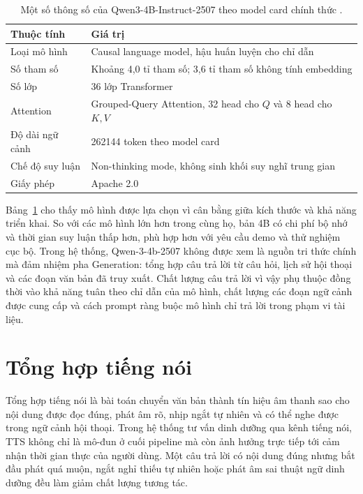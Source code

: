 \documentclass[a4paper,13pt,twoside]{report}
\begin{document}
\begin{table}[H]
    \centering
    \begin{tabular}{p{5.2cm}p{8.5cm}}
        \toprule
        Thuộc tính      & Giá trị                                                          \\
        \midrule
        Loại mô hình    & Causal language model, hậu huấn luyện cho chỉ dẫn                \\
        Số tham số      & Khoảng 4,0 tỉ tham số; 3,6 tỉ tham số không tính embedding       \\
        Số lớp          & 36 lớp Transformer                                               \\
        Attention       & Grouped-Query Attention, 32 head cho \(Q\) và 8 head cho \(K,V\) \\
        Độ dài ngữ cảnh & 262144 token theo model card                                     \\
        Chế độ suy luận & Non-thinking mode, không sinh khối suy nghĩ trung gian           \\
        Giấy phép       & Apache 2.0                                                       \\
        \bottomrule
    \end{tabular}
    \caption[Một số thông số của Qwen3-4B-Instruct-2507]{Một số thông số của Qwen3-4B-Instruct-2507 theo model card chính thức \cite{qwen3modelcard}.}
    \label{tab:qwen3-4b-specs}
\end{table}

Bảng~\ref{tab:qwen3-4b-specs} cho thấy mô hình được lựa chọn vì cân bằng giữa kích thước và khả năng triển khai. So với các mô hình lớn hơn trong cùng họ, bản 4B có chi phí bộ nhớ và thời gian suy luận thấp hơn, phù hợp hơn với yêu cầu demo và thử nghiệm cục bộ. Trong hệ thống, Qwen-3-4b-2507 không được xem là nguồn tri thức chính mà đảm nhiệm pha Generation: tổng hợp câu trả lời từ câu hỏi, lịch sử hội thoại và các đoạn văn bản đã truy xuất. Chất lượng câu trả lời vì vậy phụ thuộc đồng thời vào khả năng tuân theo chỉ dẫn của mô hình, chất lượng các đoạn ngữ cảnh được cung cấp và cách prompt ràng buộc mô hình chỉ trả lời trong phạm vi tài liệu.

\section{Tổng hợp tiếng nói}

Tổng hợp tiếng nói là bài toán chuyển văn bản thành tín hiệu âm thanh sao cho nội dung được đọc đúng, phát âm rõ, nhịp ngắt tự nhiên và có thể nghe được trong ngữ cảnh hội thoại. Trong hệ thống tư vấn dinh dưỡng qua kênh tiếng nói, TTS không chỉ là mô-đun ở cuối pipeline mà còn ảnh hưởng trực tiếp tới cảm nhận thời gian thực của người dùng. Một câu trả lời có nội dung đúng nhưng bắt đầu phát quá muộn, ngắt nghỉ thiếu tự nhiên hoặc phát âm sai thuật ngữ dinh dưỡng đều làm giảm chất lượng tương tác.
\end{document}
